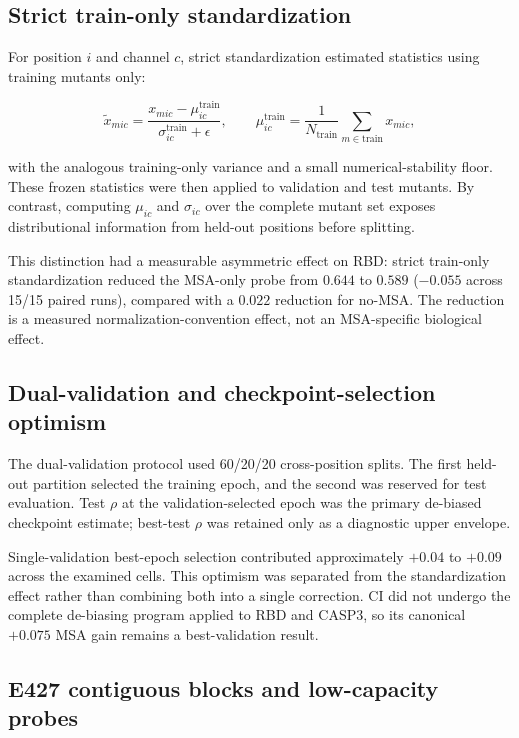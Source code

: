 \documentclass[10pt,a4paper]{article}
\begin{document}
\subsection{Strict train-only standardization}

For position $i$ and channel $c$, strict standardization estimated statistics using training mutants only:

\begin{equation}
\tilde{x}_{mic}=\frac{x_{mic}-\mu_{ic}^{\mathrm{train}}}{\sigma_{ic}^{\mathrm{train}}+\epsilon},
\qquad
\mu_{ic}^{\mathrm{train}}=\frac{1}{N_{\mathrm{train}}}\sum_{m\in\mathrm{train}}x_{mic},
\end{equation}

with the analogous training-only variance and a small numerical-stability floor. These frozen statistics were then applied to validation and test mutants. By contrast, computing $\mu_{ic}$ and $\sigma_{ic}$ over the complete mutant set exposes distributional information from held-out positions before splitting.

This distinction had a measurable asymmetric effect on RBD: strict train-only standardization reduced the MSA-only probe from $0.644$ to $0.589$ ($-0.055$ across 15/15 paired runs), compared with a $0.022$ reduction for no-MSA. The reduction is a measured normalization-convention effect, not an MSA-specific biological effect.

\subsection{Dual-validation and checkpoint-selection optimism}

The dual-validation protocol used 60/20/20 cross-position splits. The first held-out partition selected the training epoch, and the second was reserved for test evaluation. Test $\rho$ at the validation-selected epoch was the primary de-biased checkpoint estimate; best-test $\rho$ was retained only as a diagnostic upper envelope.

Single-validation best-epoch selection contributed approximately $+0.04$ to $+0.09$ across the examined cells. This optimism was separated from the standardization effect rather than combining both into a single correction. CI did not undergo the complete de-biasing program applied to RBD and CASP3, so its canonical $+0.075$ MSA gain remains a best-validation result.

\subsection{E427 contiguous blocks and low-capacity probes}
\end{document}
